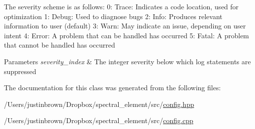  The severity scheme is as follows\-: 0\-: Trace\-: Indicates a code location, used for optimization 1\-: Debug\-: Used to diagnose bugs 2\-: Info\-: Produces relevant information to user (default) 3\-: Warn\-: May indicate an issue, depending on user intent 4\-: Error\-: A problem that can be handled has occurred 5\-: Fatal\-: A problem that cannot be handled has occurred


\begin{DoxyParams}{Parameters}
{\em severity\-\_\-index} & The integer severity below which log statements are suppressed \\
\hline
\end{DoxyParams}


The documentation for this class was generated from the following files\-:\begin{DoxyCompactItemize}
\item 
/\-Users/justinbrown/\-Dropbox/spectral\-\_\-element/src/\hyperlink{config_8hpp}{config.\-hpp}\item 
/\-Users/justinbrown/\-Dropbox/spectral\-\_\-element/src/\hyperlink{config_8cpp}{config.\-cpp}\end{DoxyCompactItemize}
